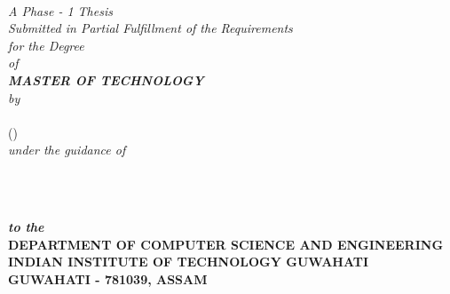 \begin{titlepage}
\begin{center}
\textheight 15.5in \textwidth 12.5in {\huge\sf  \textbf{\the\phdtitle}}\\[9ex]
{\small{\textsl{
 {A Phase - 1 Thesis \\ 
Submitted in Partial Fulfillment of the Requirements \\
for the Degree \\ 
of\\
[3ex]\small \bf MASTER OF TECHNOLOGY
}}}}\\
[10ex] \emph{by} \\[1ex]
{\sf \sf \textbf{\the\name}\\
             (\the\rollno)}\\[1ex]
\emph{under the guidance of}\\[2ex]
{\sf \bf \the\guide} \\[5ex]

\vspace{.05in}
 \begin{figure}[!h]
 \hfill
  \hfill \
 \end{figure}

{\sl \bf{to the}} \\[1ex]

{\small\bf DEPARTMENT OF COMPUTER SCIENCE AND ENGINEERING}  \\[1ex]
{\small \bf{INDIAN INSTITUTE OF TECHNOLOGY GUWAHATI \\GUWAHATI - 781039, ASSAM}}

\end{center}
\end{titlepage}
